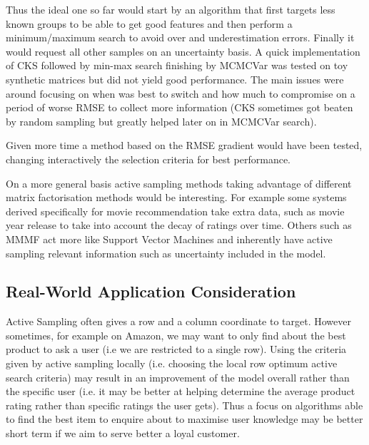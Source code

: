 Thus the ideal one so far would start by an algorithm that first targets less known groups to be able to get good features and then perform a minimum/maximum search to avoid over and underestimation errors. Finally it would request all other samples on an uncertainty basis. A quick implementation of CKS followed by min-max search finishing by MCMCVar was tested on toy synthetic matrices but did not yield good performance. The main issues were around focusing on when was best to switch and how much to compromise on a period of worse RMSE to collect more information (CKS sometimes got beaten by random sampling but greatly helped later on in MCMCVar search).

Given more time a method based on the RMSE gradient would have been tested, changing interactively the selection criteria for best performance.


On a more general basis active sampling methods taking advantage of different matrix factorisation methods would be interesting. For example some systems derived specifically for movie recommendation take extra data, such as movie year release to take into account the decay of ratings over time. Others such as MMMF act more like Support Vector Machines \cite{active-mf} and inherently have active sampling relevant information such as uncertainty included in the model. 


\subsection{Real-World Application Consideration}
Active Sampling often gives a row and a column coordinate to target. However sometimes, for example on Amazon, we may want to only find about the best product to ask a user (i.e we are restricted to a single row). Using the criteria given by active sampling locally (i.e. choosing the local row optimum active search criteria) may result in an improvement of the model overall rather than the specific user (i.e. it may be better at helping determine the average product rating rather than specific ratings the user gets). Thus a focus on algorithms able to find the best item to enquire about to maximise user knowledge may be better short term if we aim to serve better a loyal customer.


